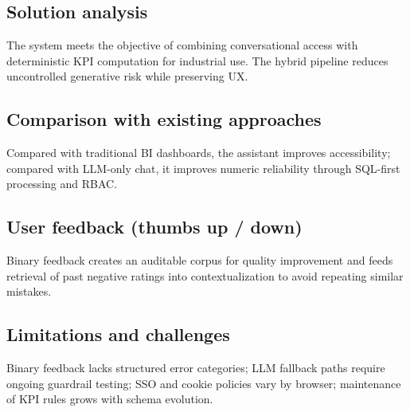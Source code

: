 \subsection{Solution analysis}
The system meets the objective of combining conversational access with deterministic KPI computation for industrial use. The hybrid pipeline reduces uncontrolled generative risk while preserving UX.

\subsection{Comparison with existing approaches}
Compared with traditional BI dashboards, the assistant improves accessibility; compared with LLM-only chat, it improves numeric reliability through SQL-first processing and RBAC.

\subsection{User feedback (thumbs up / down)}
Binary feedback creates an auditable corpus for quality improvement and feeds retrieval of past negative ratings into contextualization to avoid repeating similar mistakes.

\subsection{Limitations and challenges}
Binary feedback lacks structured error categories; LLM fallback paths require ongoing guardrail testing; SSO and cookie policies vary by browser; maintenance of KPI rules grows with schema evolution.
